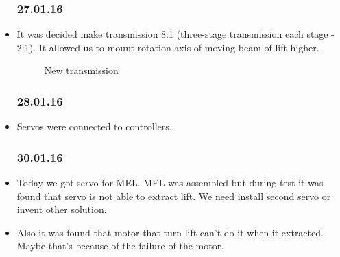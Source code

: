 \begin{itemize}
	\subsubsection{27.01.16}
		\item It was decided make transmission 8:1 (three-stage transmission each stage - 2:1). It allowed us to mount rotation axis of moving beam of lift higher. 
		\begin{figure}[H]
			\begin{minipage}[h]{1\linewidth}
				\caption{New transmission}
			\end{minipage}
		\end{figure}
	\subsubsection{28.01.16}
		\item Servos were connected to controllers.
	\subsubsection{30.01.16}
		\item Today we got servo for MEL. MEL was assembled but during test it was found that servo is not able to extract lift. We need install second servo or invent other solution.		
		\item Also it was found that motor that turn lift can't do it when it extracted. Maybe that's because of the failure of the motor.

\end{itemize}
